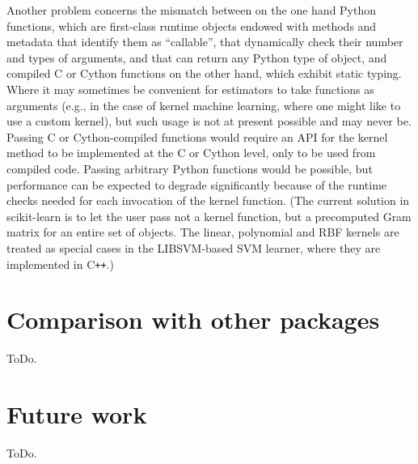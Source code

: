 \documentclass{llncs}
\DeclareRobustCommand{\VAN}[3]{#2}
\begin{document}
Another problem concerns the mismatch between on the one hand Python functions,
which are first-class runtime objects endowed with methods and metadata
that identify them as ``callable'',
that dynamically check their number and types of arguments,
and that can return any Python type of object,
and compiled C or Cython functions on the other hand,
which exhibit static typing.
Where it may sometimes be convenient for estimators
to take functions as arguments
(e.g., in the case of kernel machine learning,
where one might like to use a custom kernel),
but such usage is not at present possible and may never be.
Passing C or Cython-compiled functions would require an API for the kernel method
to be implemented at the C or Cython level,
only to be used from compiled code.
Passing arbitrary Python functions would be possible,
but performance can be expected to degrade significantly
because of the runtime checks needed for each invocation of the kernel function.
(The current solution in scikit-learn is to let the user pass not a kernel function,
but a precomputed Gram matrix for an entire set of objects.
The linear, polynomial and RBF kernels are treated as special cases in
the \textsf{LIBSVM}-based SVM learner, where they are implemented in C{}\verb!++!.)

\section{Comparison with other packages}

ToDo.

\section{Future work}

ToDo.


\DeclareRobustCommand{\VAN}[3]{#3}

\end{document}
